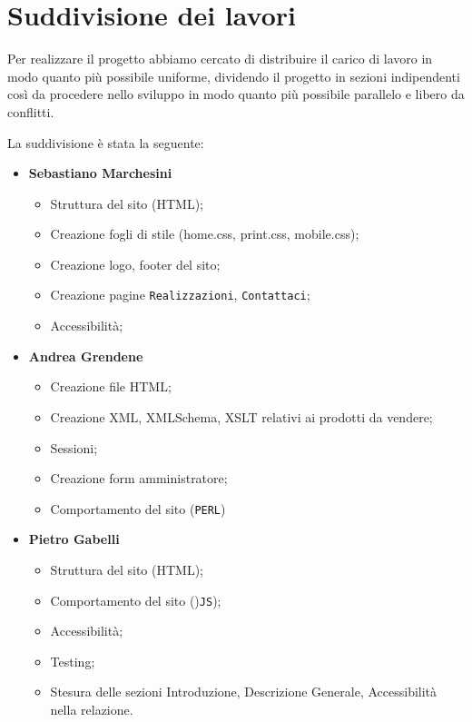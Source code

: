 \section{Suddivisione dei lavori}{
	Per realizzare il progetto abbiamo cercato di distribuire il carico di lavoro in modo quanto più possibile uniforme, dividendo il progetto in sezioni indipendenti così da procedere nello sviluppo in modo quanto più possibile parallelo e libero da conflitti.
	
	La suddivisione è stata la seguente: 	
	\begin{itemize}\itemsep1pt
		\item \textbf{Sebastiano Marchesini} 
		\begin{itemize}\itemsep1pt
			\item Struttura del sito (HTML);
			\item Creazione fogli di stile (home.css, print.css, mobile.css);
			\item Creazione logo, footer del sito;
			\item Creazione pagine \texttt{Realizzazioni}, \texttt{Contattaci};
			\item Accessibilità;
		\end{itemize}
		\item \textbf{Andrea Grendene}
		\begin{itemize}\itemsep1pt
			\item Creazione file HTML;
			\item Creazione XML, XMLSchema, XSLT relativi ai prodotti da vendere;
			\item Sessioni;
			\item Creazione form amministratore;
			\item Comportamento del sito (\texttt{PERL})
		\end{itemize}
		\item \textbf{Pietro Gabelli}
		\begin{itemize}\itemsep1pt
			\item Struttura del sito (HTML);
			\item Comportamento del sito ()\texttt{JS});
			\item Accessibilità;
			\item Testing;
			\item Stesura delle sezioni Introduzione, Descrizione Generale, Accessibilità nella relazione.
		\end{itemize}
	\end{itemize}
}